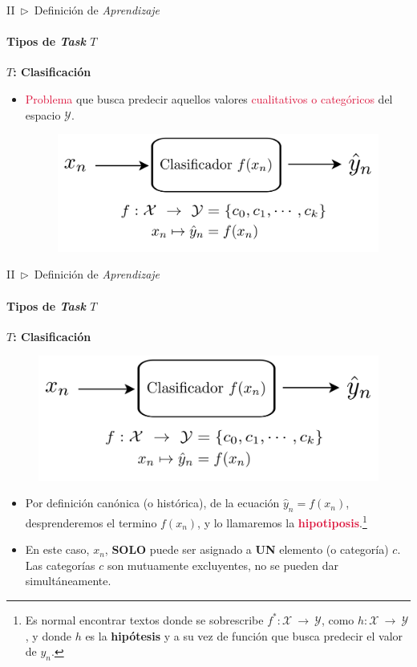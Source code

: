 \documentclass[xcolor=dvipsnames]{beamer}
\begin{document}
    \begin{frame}{II~$\rhd$~Definición de \textit{Aprendizaje}}
    \framesubtitle{Tipos de \textit{Task} \( T \)}
        \textbf{\Large{\( T \): Clasificación}}
        \vspace{2mm}
        \begin{itemize}
            \item \textcolor{crimson}{Problema} que busca predecir aquellos valores \textcolor{crimson}{cualitativos o categóricos} del espacio $\mathcal{Y}$.
            \vspace{1mm}
            \begin{figure}
                \centering
                \includegraphics[width=0.9\linewidth]{imgs/def01/task03.png}
            \end{figure}
        \end{itemize}
    \end{frame}

    \begin{frame}{II~$\rhd$~Definición de \textit{Aprendizaje}}
    \framesubtitle{Tipos de \textit{Task} \(T\)}
        \textbf{\Large{\( T \): Clasificación}}
        \begin{figure}
            \centering
            \includegraphics[width=0.55\linewidth]{imgs/def01/task03.png}
        \end{figure}
        \begin{itemize}
            \item Por definición canónica (o histórica), de la ecuación $\hat{y}_{n}=f(x_{n})$, desprenderemos el termino $f(x_{n})$, y lo llamaremos la \textbf{\textcolor{crimson}{hipotiposis}}.\footnote{\scriptsize{Es normal encontrar textos donde se sobrescribe $f^{*}:\mathcal{X}~\rightarrow~\mathcal{Y}$, como $h:\mathcal{X}~\rightarrow~\mathcal{Y}$, y donde $h$ es la \textbf{hipótesis} y a su vez de función que busca predecir el valor de $y_{n}$.}}
            \item En este caso, $x_{n}$, \textbf{SOLO} puede ser asignado a \textbf{UN} elemento (o categoría) $c$. Las categorías $c$ son mutuamente excluyentes, no se pueden dar simultáneamente.
        \end{itemize}
    \end{frame}
\end{document}
